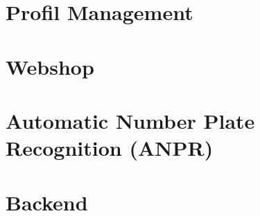 \section{Profil Management}

\section{Webshop}


\section{Automatic Number Plate Recognition (ANPR)}

\section{Backend}



